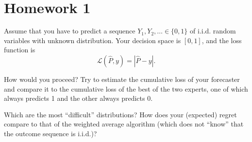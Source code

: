 \documentclass[12pt]{article}
\begin{document}
\section*{Homework 1}

Assume that you have to predict a sequence $Y_1, Y_2, \ldots \in \{0, 1\}$ of i.i.d. random variables with unknown distribution. Your decision space is $[0, 1]$, and the loss function is 
\[
\mathcal{L}(\hat{P}, y) = |\hat{P} - y|.
\]

How would you proceed? Try to estimate the cumulative loss of your forecaster and compare it to the cumulative loss of the best of the two experts, one of which always predicts 1 and the other always predicts 0. 

Which are the most ``difficult'' distributions? How does your (expected) regret compare to that of the weighted average algorithm (which does not ``know'' that the outcome sequence is i.i.d.)?
\end{document}
